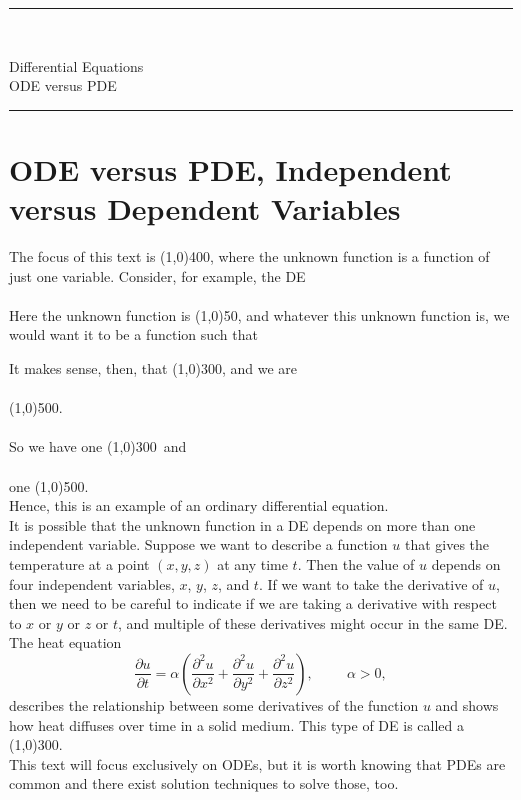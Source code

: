 \documentclass[12pt]{article}
\newcommand{\<}{\langle}
\renewcommand{\>}{\rangle}
\begin{document}
\noindent\rule{7in}{0.4pt}\\
\begin{center}
{\sc Differential Equations\\
ODE versus PDE}
\end{center}
\noindent\rule{7in}{0.4pt}
\section*{ODE versus PDE, Independent versus Dependent Variables}
\doublespacing
\noindent  The focus of this text is %
\line(1,0){400}, where the unknown function
is a function of just one variable.  Consider, for example, the DE\\ \\

\noindent  Here the unknown function is %
\line(1,0){50}, and whatever this unknown function is, we would want
it to be a function such that \\ \vspace{0.25in}

\noindent It makes sense, then, that %
\line(1,0){300}, and we are\\ \\
\line(1,0){500}.  \\ \\ So we have
one %
\line(1,0){300}\, and \\ \\
one %
\line(1,0){500}.\\
\noindent Hence, this is an example of an ordinary differential equation.\\

\noindent  It is possible that the unknown function in a DE depends on more than one independent variable.
Suppose we want to describe a function $u$ that gives the temperature at a point $(x, y, z)$ at any time $t$.
Then the value of $u$ depends on four independent variables, $x$, $y$, $z$, and $t$.  If we want to take
the derivative of $u$, then we need to be careful to indicate if we are taking a derivative with respect to $x$
or $y$ or $z$ or $t$, and multiple of these derivatives might occur in the same DE.  The heat equation
	\[ \frac{\partial u}{\partial t} = \alpha \left( \frac{\partial^2 u}{\partial x^2} 
		+ \frac{\partial^2 u}{\partial y^2} 
		+ \frac{\partial^2 u}{\partial z^2}\right), \hspace{1cm} \alpha >0, \]	%
describes the relationship between some derivatives of the function $u$ and shows how heat diffuses
over time in a solid medium.  This type of DE is called a %
\line(1,0){300}.\\  This text will
focus exclusively on ODEs, but it is worth knowing that PDEs are common and there exist solution techniques
to solve those, too.
\end{document}
